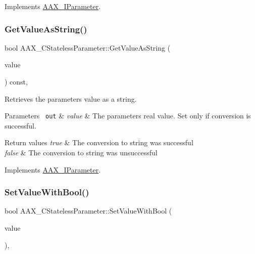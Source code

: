 Implements \mbox{\hyperlink{a01857_ad9ab3c9e0ee521e445f44b77ae5d9d06}{A\+A\+X\+\_\+\+I\+Parameter}}.

\mbox{\label{a01541_ac3e4ee150fd49f1ebd934d4269a1aad1}} 
\subsubsection{\texorpdfstring{GetValueAsString()}{GetValueAsString()}}
{\footnotesize\ttfamily bool A\+A\+X\+\_\+\+C\+Stateless\+Parameter\+::\+Get\+Value\+As\+String (\begin{DoxyParamCaption}\item[{\mbox{\hyperlink{a01873}{A\+A\+X\+\_\+\+I\+String}} $\ast$}]{value }\end{DoxyParamCaption}) const\hspace{0.3cm}{\ttfamily [inline]}, {\ttfamily [virtual]}}



Retrieves the parameter\textquotesingle{}s value as a string. 


\begin{DoxyParams}[1]{Parameters}
\mbox{\texttt{ out}}  & {\em value} & The parameter\textquotesingle{}s real value. Set only if conversion is successful.\\
\hline
\end{DoxyParams}

\begin{DoxyRetVals}{Return values}
{\em true} & The conversion to string was successful \\
\hline
{\em false} & The conversion to string was unsuccessful \\
\hline
\end{DoxyRetVals}


Implements \mbox{\hyperlink{a01857_ab0d640c37120decbbe48f0c1483770f9}{A\+A\+X\+\_\+\+I\+Parameter}}.

\mbox{\label{a01541_a9cd0c740db21f050c01efaab37afba54}} 
\subsubsection{\texorpdfstring{SetValueWithBool()}{SetValueWithBool()}}
{\footnotesize\ttfamily bool A\+A\+X\+\_\+\+C\+Stateless\+Parameter\+::\+Set\+Value\+With\+Bool (\begin{DoxyParamCaption}\item[{bool}]{value }\end{DoxyParamCaption})\hspace{0.3cm}{\ttfamily [inline]}, {\ttfamily [virtual]}}



